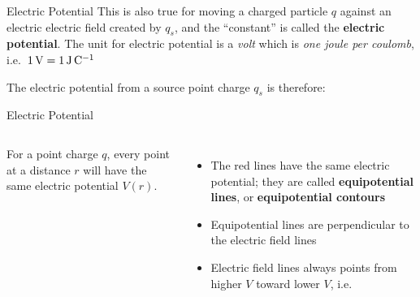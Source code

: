 \documentclass[12pt,aspectratio=169]{beamer}
\begin{document}
\begin{frame}{Electric Potential}
  This is also true for moving a charged particle $q$ against an electric
  electric field created by $q_s$, and the ``constant'' is called the
  \textbf{electric potential}. The unit for electric potential is a \emph{volt}
  which is \emph{one joule per coulomb}, i.e.\
  $\SI1\volt=\SI1{\joule\per\coulomb}$


  The electric potential from a source point charge $q_s$ is therefore:

\end{frame}



\begin{frame}{Electric Potential}
  \begin{columns}
    \centering
 
    For a point charge $q$, every point at a distance $r$ will have the same
    electric potential $V(r)$.
    \begin{itemize}
    \item The red lines have the same electric potential; they are called
      \textbf{equipotential lines}, or \textbf{equipotential contours}
    \item Equipotential lines are perpendicular to the electric field lines
    \item Electric field lines always points from higher $V$ toward lower $V$,
      i.e.

    \end{itemize}
  \end{columns}
\end{frame}
\end{document}
